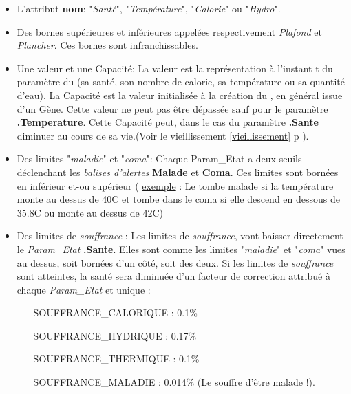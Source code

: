 \documentclass[french]{report}
\newlength{\du}\fi
\begin{document}
\begin{itemize}
	\item L'attribut \textbf{nom}: "\textit{Santé}", "\textit{Température}", "\textit{Calorie}" ou "\textit{Hydro}".\\
	
	\item Des bornes supérieures et inférieures appelées respectivement \textit{Plafond} et \textit{Plancher}. Ces bornes sont \underline{infranchissables}.\\
	
	\item Une valeur et une Capacité: La valeur est la représentation à l'instant t du paramètre du \CoCiX (sa santé, son nombre de calorie, sa température ou sa quantité d'eau). La Capacité est la valeur initialisée à la création du \CoCiX, en général issue d'un Gène. Cette valeur ne peut pas être  dépassée sauf pour le paramètre \textbf{.Temperature}. Cette Capacité peut, dans le cas du paramètre \textbf{.Sante} diminuer au cours de sa vie.(Voir le vieillissement \ref{vieillissement} p \pageref{vieillissement}).\\
	
	\item Des limites "\textit{maladie}" et "\textit{coma}": Chaque Param\_Etat a deux seuils déclenchant les \textit{balises d'alertes} \textbf{Malade} et \textbf{Coma}. Ces limites sont  bornées en inférieur et-ou supérieur ( \underline{exemple} : Le \CoCiX tombe malade si la température monte au dessus de 40\degres C et tombe dans le coma si elle descend en dessous de 35.8\degres C ou  monte au dessus de 42\degres C)\\
	
	\item Des limites de \textit{souffrance} : Les limites de \textit{souffrance}, vont baisser directement le \textit{Param\_Etat} \textbf{.Sante}. Elles sont comme les limites "\textit{maladie}" et "\textit{coma}" vues au dessus, soit bornées d'un côté, soit des deux. Si les limites de \textit{souffrance} sont atteintes, la santé sera diminuée d'un facteur de correction attribué à chaque \textit{Param\_Etat} et unique :\label{souffrances}\\
	\begin{itemize}
		\item[SOUFFRANCE\_CALORIQUE] : 0.1\%
		\item[SOUFFRANCE\_HYDRIQUE] : 0.17\%
		\item[SOUFFRANCE\_THERMIQUE] : 0.1\%
		\item[SOUFFRANCE\_MALADIE] : 0.014\% (Le \CoCiX souffre d'être malade !).\\
	\end{itemize}
	
\end{itemize}
\end{document}
